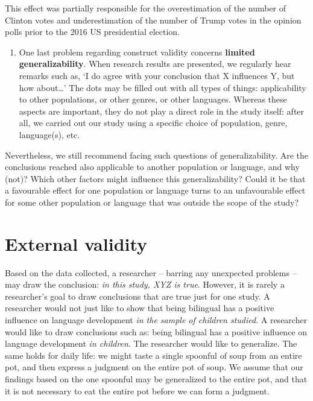 \documentclass[
]{book}
\providecommand{\tightlist}{%
  \setlength{\itemsep}{0pt}\setlength{\parskip}{0pt}}
\begin{document}
This effect was partially responsible for the overestimation of the number of Clinton votes and underestimation of the number of Trump votes in the opinion polls prior to the 2016 US presidential election.

\begin{enumerate}
\def\labelenumi{\arabic{enumi}.}
\setcounter{enumi}{6}
\tightlist
\item
  One last problem regarding construct validity concerns \textbf{limited generalizability}. When research results are presented, we regularly hear remarks such as, `I do agree with your conclusion that X influences Y, but how about\ldots{}' The dots may be filled out with all types of things: applicability to other populations, or other genres, or other languages. Whereas these aspects are important, they do not play a direct role in the study itself: after all, we carried out our study using a specific choice of population, genre, language(s), etc.
\end{enumerate}

Nevertheless, we still recommend facing such questions of generalizability. Are the conclusions reached also applicable to another population or language, and why (not)? Which other factors might influence this generalizability? Could it be that a favourable effect for one population or language turns to an unfavourable effect for some other population or language that was outside the scope of the study?

\hypertarget{sec:externalvalidity}{%
\section{External validity}\label{sec:externalvalidity}}

Based on the data collected, a researcher -- barring any unexpected problems -- may draw the conclusion: \emph{in this study, XYZ is true}. However, it is rarely a researcher's goal to draw conclusions that are true just for one study. A researcher would not just like to show that being bilingual has a positive influence on language development \emph{in the sample of children studied}. A researcher would like to draw conclusions such as: being bilingual has a positive influence on language development \emph{in children}. The researcher would like to generalize. The same holds for daily life: we might taste a single spoonful of soup from an entire pot, and then express a judgment on the entire pot of soup. We assume that our findings based on the one spoonful may be generalized to the entire pot, and that it is not necessary to eat the entire pot before we can form a judgment.
\end{document}
